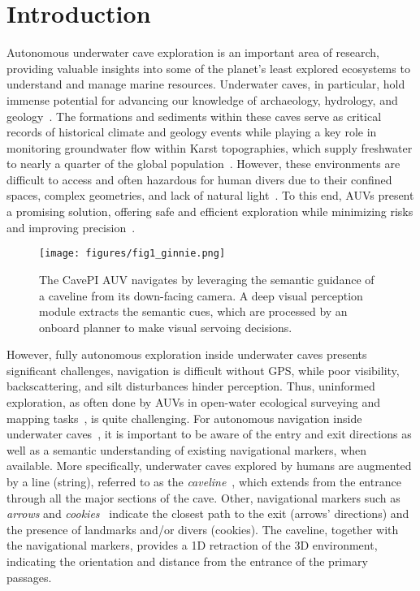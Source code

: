 \section{Introduction}
Autonomous underwater cave exploration is an important area of research, providing valuable insights into some of the planet's least explored ecosystems to understand and manage marine resources. Underwater caves, in particular, hold immense potential for advancing our knowledge of archaeology, hydrology, and geology~\cite{lace2013biological}. The formations and sediments within these caves serve as critical records of historical climate and geology events while playing a key role in monitoring groundwater flow within Karst topographies, which supply freshwater to nearly a quarter of the global population~\cite{karstbook}. However, these environments are difficult to access and often hazardous for human divers due to their confined spaces, complex geometries, and lack of natural light~\cite{potts2016thirty,buzzacott2009american}. To this end, AUVs present a promising solution, offering safe and efficient exploration while minimizing risks and improving  precision~\cite{abdullah2023caveseg}.

\begin{figure}[t]
    \centering
    \texttt{[image: figures/fig1\_ginnie.png]}%
    \vspace{-3mm}
    \caption{The CavePI AUV navigates by leveraging the semantic guidance of a caveline from its down-facing camera. A deep visual perception module extracts the semantic cues, which are processed by an onboard planner to make visual servoing decisions.
    }%
    \vspace{-2mm}
    \label{fig:vehicle}
\end{figure}


However, fully autonomous exploration inside underwater caves presents significant challenges, navigation is difficult without GPS, while poor visibility, backscattering, and silt disturbances hinder perception. Thus, uninformed exploration, as often done by AUVs in open-water ecological surveying and mapping tasks~\cite{manderson2020visionbasedgoalconditionedpoliciesunderwater}, is quite challenging. For autonomous navigation inside underwater caves~\cite{richmond2020autonomous,yu2023weakly}, it is important to be aware of the entry and exit directions as well as a semantic understanding of existing navigational markers, when available. More specifically, underwater caves explored by humans are augmented by a line (string), referred to as the \emph{caveline}~\cite{exley1986basic}, which extends from the entrance through all the major sections of the cave. Other, navigational markers such as \emph{arrows} and \emph{cookies}~\cite{abdullah2023caveseg} indicate the closest path to the exit (arrows' directions) and the presence of landmarks and/or divers (cookies). The caveline, together with the navigational markers, provides a 1D retraction of the 3D environment, indicating the orientation and distance from the entrance of the primary passages. 








